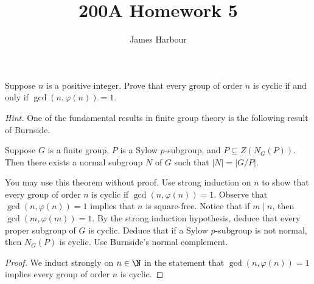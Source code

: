 \documentclass[12pt]{article}
\title{200A Homework 5}
\author{James Harbour}
\begin{document}
\maketitle
\begin{homeworkProblem}
  Suppose $n$ is a positive integer. Prove that every group of order $n$ is cyclic if and only if $\gcd(n, \varphi(n)) = 1$.  

  \textit{Hint.} One of the fundamental results in finite group theory is the following result of Burnside.

  \begin{theorem}
    Suppose $G$ is a finite group, $P$ is a Sylow $p$-subgroup, and $P \subseteq Z(N_G(P))$. Then there exists a normal subgroup $N$ of $G$ such that $\lvert N \rvert = \lvert G / P \rvert$.
  \end{theorem}

  You may use this theorem without proof. Use strong induction on $n$ to show that every group of order $n$ is cyclic if $\gcd(n, \varphi(n)) = 1$.  
  Observe that $\gcd(n, \varphi(n)) = 1$ implies that $n$ is square-free.  
  Notice that if $m \mid n$, then $\gcd(m, \varphi(m)) = 1$.  
  By the strong induction hypothesis, deduce that every proper subgroup of $G$ is cyclic.  
  Deduce that if a Sylow $p$-subgroup is not normal, then $N_G(P)$ is cyclic.  
  Use Burnside’s normal complement.

\begin{proof}
  We induct strongly on $ n\in \N $  in the statement that $ \gcd(n,\varphi(n)) = 1 $ implies every group of order $ n $ is cyclic.
\end{proof}

\end{homeworkProblem}
\end{document}
